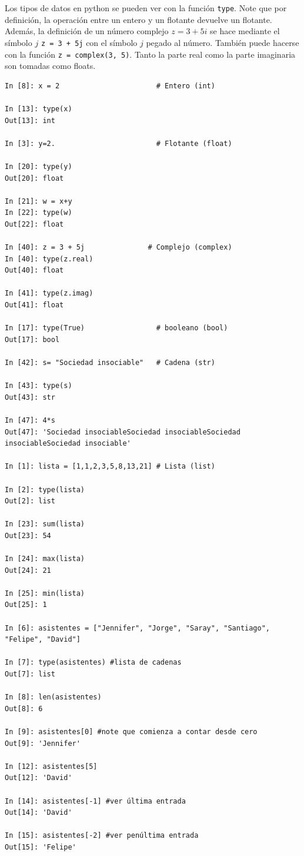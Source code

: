 \documentclass[12pt]{article}
\begin{document}
Los tipos de datos en python se pueden ver con la función \lstinline|type|. Note que por definición, 
la operación entre un entero y un flotante devuelve un flotante. Además, la definición de un número 
complejo $z = 3 + 5 i $ se hace mediante el símbolo $j$ \lstinline|z = 3 + 5j| con el símbolo $j$ pegado
al número. También puede hacerse con la función  \lstinline|z = complex(3, 5)|. Tanto la parte real 
como la parte imaginaria son tomadas como floats. 
%
\begin{lstlisting}
In [8]: x = 2                       # Entero (int)

In [13]: type(x)
Out[13]: int

In [3]: y=2.                        # Flotante (float)

In [20]: type(y)
Out[20]: float

In [21]: w = x+y
In [22]: type(w)
Out[22]: float

In [40]: z = 3 + 5j               # Complejo (complex)
In [40]: type(z.real)
Out[40]: float

In [41]: type(z.imag)
Out[41]: float

In [17]: type(True)                 # booleano (bool)
Out[17]: bool

In [42]: s= "Sociedad insociable"   # Cadena (str)

In [43]: type(s)
Out[43]: str

In [47]: 4*s
Out[47]: 'Sociedad insociableSociedad insociableSociedad insociableSociedad insociable'

In [1]: lista = [1,1,2,3,5,8,13,21] # Lista (list)

In [2]: type(lista)
Out[2]: list

In [23]: sum(lista)
Out[23]: 54

In [24]: max(lista)
Out[24]: 21

In [25]: min(lista)
Out[25]: 1

In [6]: asistentes = ["Jennifer", "Jorge", "Saray", "Santiago", "Felipe", "David"]

In [7]: type(asistentes) #lista de cadenas
Out[7]: list

In [8]: len(asistentes)
Out[8]: 6

In [9]: asistentes[0] #note que comienza a contar desde cero 
Out[9]: 'Jennifer'

In [12]: asistentes[5]
Out[12]: 'David'

In [14]: asistentes[-1] #ver última entrada
Out[14]: 'David'

In [15]: asistentes[-2] #ver penúltima entrada
Out[15]: 'Felipe'


\end{lstlisting}
\end{document}
